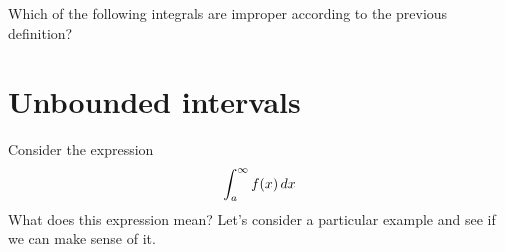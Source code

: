 \documentclass{ximera}
\begin{document}
\begin{question}
  Which of the following integrals are improper according to the previous definition?
  \begin{selectAll}
  \end{selectAll}
\end{question}





\section{Unbounded intervals}


Consider the expression
\[ 
\int_{a}^{\infty} f(x) \mathop{}\!d x
\]
What does this expression mean?  Let's consider a particular example and see if we can make sense of it.
\end{document}
